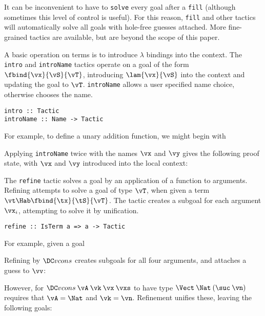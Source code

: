 It can be inconvenient to have to \texttt{solve} every goal after a
\texttt{fill} (although sometimes this level of control is
useful). For this reason, \texttt{fill} and other tactics will
automatically solve all goals with hole-free guesses attached. More
fine-grained tactics are available, but are beyond the scope of this paper.

A basic operation on terms is to introduce $\lambda$ bindings into the
context. The \texttt{intro} and \texttt{introName} tactics operate on
a goal of the form $\fbind{\vx}{\vS}{\vT}$, introducing
$\lam{\vx}{\vS}$ into the context and updating the goal to
$\vT$. \texttt{introName} allows a user specified name choice,
otherwise \Ivor{} chooses the name.

\verb+intro :: Tactic+\\
\verb+introName :: Name -> Tactic+

For example, to define a unary addition function, we might begin
with


Applying \texttt{introName} twice with the names $\vx$ and $\vy$ gives
the following proof state, with $\vx$ and $\vy$ introduced into the
local context:

The \texttt{refine} tactic solves a goal by an application of a
function to arguments. Refining attempts to solve a goal of type
$\vT$, when given a term $\vt\Hab\fbind{\tx}{\tS}{\vT}$. The tactic
creates a subgoal for each argument $\vx_i$, attempting to solve it by
unification.

\verb+refine :: IsTerm a => a -> Tactic+

For example, given a goal
\DM{
\Axiom{
\hole{\vv}{\Vect\:\Nat\:(\suc\:\vn)}}
}

Refining by $\Vcons$ creates subgoals for all four arguments, and
attaches a guess to $\vv$:
\DM{
\Axiom{
\AR{
\hole{\vA}{\Type}\\
\hole{\vk}{\Nat}\\
\hole{\vx}{\vA}\\
\hole{\vxs}{\Vect\:\vA\:\vk}\\
\guess{\vv}{\Vect\:\Nat\:(\suc\:\vn)}{\Vcons\:\vA\:\vk\:\vx\:\vxs}
}
}
}

However, for $\Vcons\:\vA\:\vk\:\vx\:\vxs$ to have type
$\Vect\:\Nat\:(\suc\:\vn)$ requires that $\vA=\Nat$ and $\vk=\vn$.
Refinement unifies these, leaving the
following goals:
\DM{
\Axiom{
\AR{
\hole{\vx}{\Nat}\\
\hole{\vxs}{\Vect\:\Nat\:\vn}\\
\guess{\vv}{\Vect\:\Nat\:(\suc\:\vn)}{\Vcons\:\Nat\:\vn\:\vx\:\vxs}
}
}
}


